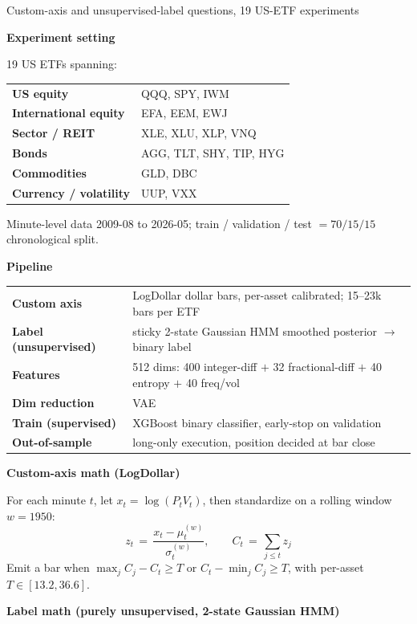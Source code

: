 \documentclass[11pt]{article}
\newcommand{\shead}[1]{\par\vspace{6pt}\noindent\textbf{\large #1}\par\vspace{3pt}}
\begin{document}
\begin{center}
{\small Custom-axis and unsupervised-label questions, 19 US-ETF experiments}
\end{center}

\shead{Experiment setting}

19 US ETFs spanning:

\begin{tabular}{@{}ll@{}}
\textbf{US equity} & QQQ, SPY, IWM \\
\textbf{International equity} & EFA, EEM, EWJ \\
\textbf{Sector / REIT} & XLE, XLU, XLP, VNQ \\
\textbf{Bonds} & AGG, TLT, SHY, TIP, HYG \\
\textbf{Commodities} & GLD, DBC \\
\textbf{Currency / volatility} & UUP, VXX \\
\end{tabular}

\smallskip
Minute-level data 2009-08 to 2026-05; train / validation / test $= 70 / 15 / 15$ chronological split.

\shead{Pipeline}

\begin{tabular}{@{}ll@{}}
\textbf{Custom axis} & LogDollar dollar bars, per-asset calibrated; 15--23k bars per ETF \\
\textbf{Label (unsupervised)} & sticky 2-state Gaussian HMM smoothed posterior $\to$ binary label \\
\textbf{Features} & 512 dims: 400 integer-diff $+$ 32 fractional-diff $+$ 40 entropy $+$ 40 freq/vol \\
\textbf{Dim reduction} & VAE \\
\textbf{Train (supervised)} & XGBoost binary classifier, early-stop on validation \\
\textbf{Out-of-sample} & long-only execution, position decided at bar close \\
\end{tabular}

\shead{Custom-axis math (LogDollar)}

For each minute $t$, let $x_t = \log(P_t V_t)$, then standardize on a rolling window $w = 1950$:
\[ z_t \,=\, \frac{x_t - \mu_t^{(w)}}{\sigma_t^{(w)}}, \qquad C_t \,=\, \sum_{j \le t} z_j \]
Emit a bar when $\max_j C_j - C_t \ge T$ or $C_t - \min_j C_j \ge T$, with per-asset $T \in [13.2, 36.6]$.

\shead{Label math (purely unsupervised, 2-state Gaussian HMM)}
\end{document}
